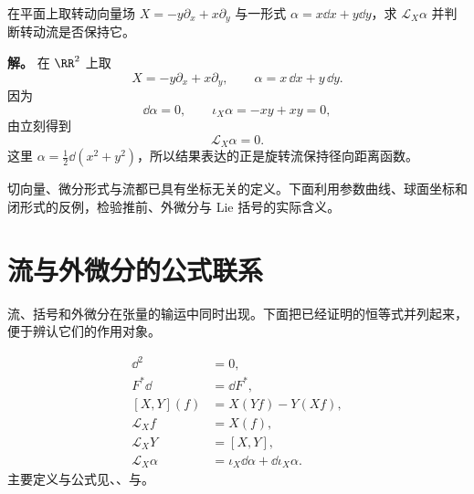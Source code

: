 \begin{exbox}[旋转流保持径向一形式]
在平面上取转动向量场 $X=-y\partial_x+x\partial_y$ 与一形式 $\alpha=x\dd x+y\dd y$，求 $\mathcal L_X\alpha$ 并判断转动流是否保持它。

\textbf{解。} 在 $\RR^2$ 上取
\[
X=-y\partial_x+x\partial_y,
\qquad
\alpha=x\,\dd x+y\,\dd y.
\]
因为
\[
\dd\alpha=0,
\qquad
\iota_{X}\alpha=-xy+xy=0,
\]
由立刻得到
\[
\mathcal L_X\alpha=0.
\]
这里 $\alpha=\tfrac12\dd(x^2+y^2)$，所以结果表达的正是旋转流保持径向距离函数。
\end{exbox}


切向量、微分形式与流都已具有坐标无关的定义。下面利用参数曲线、球面坐标和闭形式的反例，检验推前、外微分与 Lie 括号的实际含义。






\section{流与外微分的公式联系}
流、括号和外微分在张量的输运中同时出现。下面把已经证明的恒等式并列起来，便于辨认它们的作用对象。
\begin{note}[公式之间的联系]
\begin{align*}
\dd^2&=0,\\
F^*\dd&=\dd F^*,\\
[X,Y](f)&=X(Yf)-Y(Xf),\\
\mathcal L_Xf&=X(f),\\
\mathcal L_XY&=[X,Y],\\
\mathcal L_X\alpha&=\iota_{X}\dd\alpha+\dd\iota_{X}\alpha.
\end{align*}
主要定义与公式见、、与。
\end{note}


